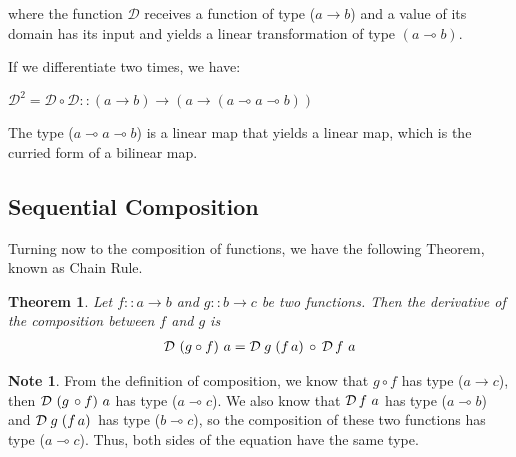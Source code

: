 \documentclass[11pt,a4]{article}
\newtheorem{teor}{Theorem}[section]
\theoremstyle{definition}
\theoremstyle{Definition}
\theoremstyle{Definition}
\newtheorem{nota}{Note}[section]
\begin{document}
	where the function $\mathcal{D}$ receives a function of type ($a \to b$) and a value of its domain has its input and yields a linear transformation of type $(a \multimap b)$. 
	
	If we differentiate two times, we have:
	
	\quad $ \mathcal{D}^{2} = \mathcal{D} \circ \mathcal{D} :: (a \to b) \to (a \to (a \multimap a \multimap b ))$
	
	The type ($a \multimap a \multimap b$) is a linear map that yields a linear map, which is the curried form of
	a bilinear map.
	
	\subsection{Sequential Composition}
	Turning now to the composition of functions, we have the following Theorem, known as Chain Rule.
	\begin{teor}
		
		Let  $f:: a \to b$ and $g:: b \to c$ be two functions. Then the derivative of the composition between $f$ and $g$ is
		\begin{align*}
		\mathcal{D} \ (g \circ f ) \ a= \mathcal{D} \hspace{0.9mm} g \hspace{1.0mm}  (f \hspace{0.5mm} a)   \hspace{0.6mm} \circ \hspace{0.6mm} \mathcal{D} \hspace{0.6mm} f \ a
		\end{align*}
	\end{teor}
	
	\begin{nota}
		From the definition of composition, we know that $g \circ f$ has type ($a \to c$), then $\mathcal{D} \ (g \hspace{0.5mm} \circ f) \ a $\hspace{0.5mm} has type ($a \multimap c$). We also know that $\mathcal{D} \hspace{0.6mm} f \ a$ has type ($a \multimap b$) and $\mathcal{D} \hspace{0.9mm} g \hspace{1.0mm}  (f \hspace{0.5mm} a)   \hspace{0.6mm}$ has type ($b \multimap c$), so the composition of these two functions has type ($a \multimap c$). Thus, both sides of the
		equation have the same type.
	\end{nota}
	
\end{document}
